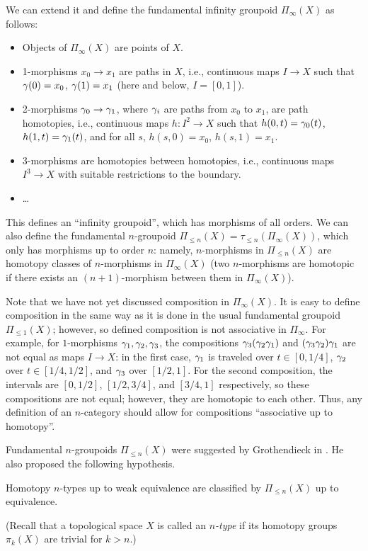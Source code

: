 We can extend it and define the fundamental infinity groupoid $\Pi_{\infty}(X)$
as follows:
\begin{itemize}
  \item Objects of $\Pi_{\infty}(X)$ are points of $X$.
  \item 1-morphisms $x_0\to x_1$ are paths in $X$, i.e., continuous maps
    $I\to X$ such that $\gamma(0)=x_0$, $\gamma(1)=x_1$ (here and below, $I=[0,1]$).
  \item 2-morphisms $\gamma_0\to \gamma_1$, where $\gamma_i$ are paths from $x_0$ to
  $x_1$, are path homotopies, i.e., continuous maps $h\colon I^2\to X$ such that
  $h(0,t)=\gamma_0(t)$, $h(1, t)=\gamma_1(t)$, and for all $s$, $h(s,0)=x_0$,
  $h(s,1)=x_1$.
  \item 3-morphisms are homotopies between homotopies, i.e., continuous maps
  $I^3\to X$ with suitable restrictions to the boundary.
  \item \dots
\end{itemize}
This defines an ``infinity groupoid'', which has morphisms of all orders. We can
also define the fundamental $n$-groupoid $\Pi_{\leq n}(X)=\tau_{\leq
n}(\Pi_\infty(X))$, which only has morphisms up to order $n$: namely,
$n$-morphisms in $\Pi_{\leq n}(X)$ are homotopy classes of
$n$-morphisms in $\Pi_{\infty}(X)$ (two $n$-morphisms are homotopic if there
exists an $(n+1)$-morphism between them in $\Pi_\infty(X)$).

Note that we have not yet discussed composition in $\Pi_\infty(X)$. It is easy
to define composition in the same way as it is done in the usual fundamental
groupoid $\Pi_{\le 1}(X)$; however, so defined composition is not associative in
$\Pi_\infty$. For example, for $1$-morphisms $\gamma_1, \gamma_2, \gamma_3$, the
compositions $\gamma_3 (\gamma_2 \gamma_1)$ and $(\gamma_3 \gamma_2)\gamma_1$ are not equal as
maps $I\to X$: in the first case, $\gamma_1$ is traveled over $t\in [0, 1/4]$,
$\gamma_2$ over $t\in [1/4, 1/2]$, and $\gamma_3$ over $[1/2,1]$. For the second
composition, the intervals are $[0, 1/2]$, $[1/2, 3/4]$, and $[3/4,1]$
respectively, so these compositions are not equal; however, they are homotopic
to each other. Thus, any definition of an $n$-category should allow for
compositions ``associative up to homotopy''.


Fundamental $n$-groupoids $\Pi_{\leq n}(X)$ were suggested by Grothendieck in
\cite{grothendieck}. He also proposed the following hypothesis.
\begin{conjecture}
  Homotopy $n$-types up to weak equivalence
  are classified by $\Pi_{\leq n}(X)$ up to equivalence.
\end{conjecture}
(Recall that a topological space $X$ is called an \emph{$n$-type} if its
homotopy groups $\pi_k(X)$ are trivial for $k>n$.)

